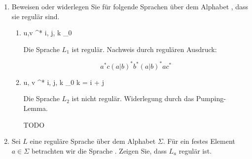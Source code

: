 \documentclass{lehramt-informatik-aufgabe}
\begin{document}
\begin{enumerate}
\begin{liAntwort}
\end{liAntwort}


\item Beweisen oder widerlegen Sie für folgende Sprachen über dem
Alphabet , dass sie regulär sind.

\begin{enumerate}


\item {}
{u,v \in {}^*  i, j, k \in {}_0}

\begin{liAntwort}
Die Sprache $L_1$ ist regulär. Nachweis durch regulären Ausdruck:

\begin{displaymath}
a^* c (a|b)^* b^* (a|b)^* a c^*
\end{displaymath}
\end{liAntwort}


\item {}
{u, v \in {}^*  i, j, k \in {}_0 k = i + j}

\begin{liAntwort}
Die Sprache $L_2$ ist nicht regulär. Widerlegung durch das Pumping-Lemma.

TODO
\end{liAntwort}

\end{enumerate}


\item Sei $L$ eine reguläre Sprache über dem Alphabet $\Sigma$. Für ein
festes Element $a \in \Sigma$ betrachten wir die Sprache
. Zeigen Sie, dass $L_a$
regulär ist.
\end{enumerate}
\end{document}
